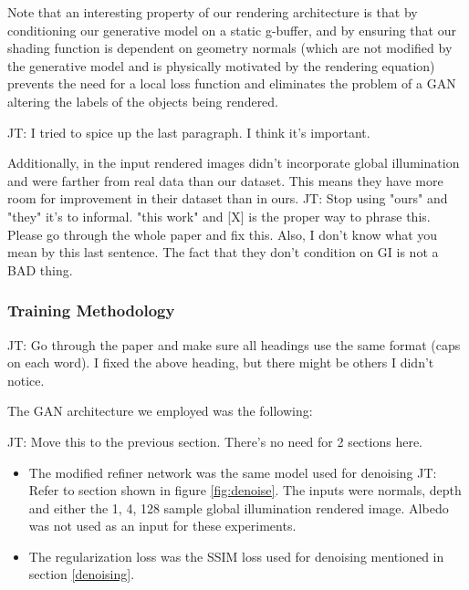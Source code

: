 \documentclass[10pt,twocolumn,letterpaper]{article}
\newcommand{\tompson}[1]{{\color{green} JT: #1}}
\begin{document}
Note that an interesting property of our rendering architecture is that by conditioning our generative model on a static g-buffer, and by ensuring that our shading function is dependent on geometry normals (which are not modified by the generative model and is physically motivated by the rendering equation) 
prevents the need for a local loss function and eliminates the problem of a GAN altering the labels of the objects being rendered.

\tompson{I tried to spice up the last paragraph. I think it's important.}

Additionally, in \cite{DBLP:journals/corr/ShrivastavaPTSW16} the input rendered images didn't incorporate global illumination and were farther from real data than our dataset. This means they have more room for improvement in their dataset than in ours. \tompson{Stop using "ours" and "they" it's to informal. "this work" and [X] is the proper way to phrase this. Please go through the whole paper and fix this. Also, I don't know what you mean by this last sentence. The fact that they don't condition on GI is not a BAD thing.}


\subsubsection{Training Methodology} \label{sec:gans}

\tompson{Go through the paper and make sure all headings use the same format (caps on each word). I fixed the above heading, but there might be others I didn't notice.}

The GAN architecture we employed was the following:

\tompson{Move this to the previous section. There's no need for 2 sections here.}

\begin{itemize}
\item The modified refiner network was the same model used for denoising \tompson{Refer to section} shown in figure \ref{fig:denoise}.  The inputs were normals, depth and either the 1, 4, 128 sample global illumination rendered image. Albedo was not used as an input for these experiments.
\item The regularization loss was the SSIM loss used for denoising mentioned in section \ref{denoising}.
\end{itemize}
\end{document}
